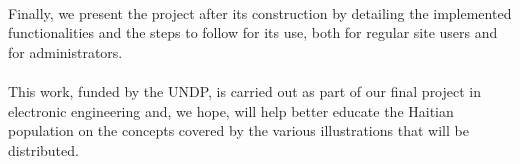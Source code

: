 \begin{center}
\begin{minipage}{0.75\textwidth}
		\paragraph{}Finally, we present the project after its construction by detailing the implemented functionalities and the steps to follow for its use, both for regular site users and for administrators.\vspace{0.5cm}
		
		\paragraph{} \noindent This work, funded by the UNDP, is carried out as part of our final project in electronic engineering and, we hope, will help better educate the Haitian population on the concepts covered by the various illustrations that will be distributed.
	\end{minipage}
	
	
	
	
	
	
	
	
	
	
	
	
	
	
	
\end{center}